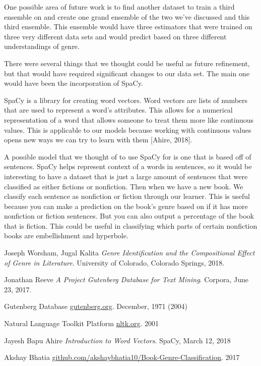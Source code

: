 \documentclass{article}
\begin{document}
One possible area of future work is to find another dataset to train a third ensemble on and create one grand ensemble of the two we’ve discussed and this third ensemble. This ensemble would have three estimators that were trained on three very different data sets and would predict based on three different understandings of genre.\par
There were several things that we thought could be useful as future refinement, but that would have required significant changes to our data set. The main one would have been the incorporation of SpaCy.\par
	SpaCy is a library for creating word vectors. Word vectors are lists of numbers that are used to represent a word’s attributes. This allows for a numerical representation of a word that allows someone to treat them more like continuous values. This is applicable to our models because working with continuous values opens new ways we can try to learn with them [Ahire, 2018].\par
	A possible model that we thought of to use SpaCy for is one that is based off of sentences. SpaCy helps represent context of a words in sentences, so it would be interesting to have a dataset that is just a large amount of sentences that were classified as either fictions or nonfiction. Then when we have a new book. We classify each sentence as nonfiction or fiction through our learner. This is useful because you can make a prediction on the book’s genre based on if it has more nonfiction or fiction sentences. But you can also output a percentage of the book that is fiction. This could be useful in classifying which parts of certain nonfiction books are embellishment and hyperbole.\par

\begin{thebibliography}{9}
Joseph Worsham, Jugal Kalita
\textit{Genre Identification and the Compositional Effect of Genre in Literature}. 
University of Colorado, Colorado Springs, 2018.

Jonathan Reeve
\textit{A Project Gutenberg Database for Text Mining}. 
Corpora, June 23, 2017.

Gutenberg Database
\underline{gutenberg.org}. 
December, 1971 (2004)

Natural Language Toolkit Platform
\underline{nltk.org}. 
2001

Jayesh Bapu Ahire
\textit{Introduction to Word Vectors}. 
SpaCy, March 12, 2018

Akshay Bhatia
\underline{github.com/akshaybhatia10/Book-Genre-Classification}. 
2017

 
\end{thebibliography}
\end{document}
